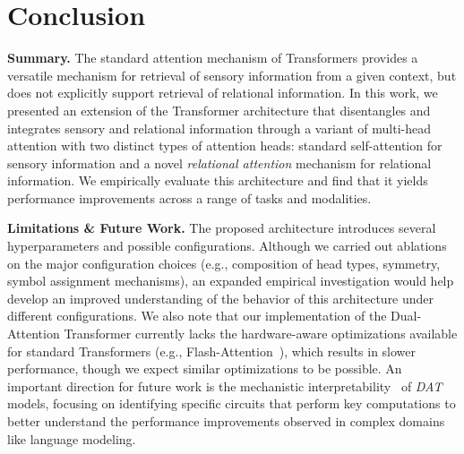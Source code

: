 \section{Conclusion}\label{sec:discussion}

\textbf{Summary.} The standard attention mechanism of Transformers provides a versatile mechanism for retrieval of sensory information from a given context, but does not explicitly support retrieval of relational information. In this work, we presented an extension of the Transformer architecture that disentangles and integrates sensory and relational information through a variant of multi-head attention with two distinct types of attention heads: standard self-attention for sensory information and a novel \textit{relational attention} mechanism for relational information. We empirically evaluate this architecture and find that it yields performance improvements across a range of tasks and modalities.

\textbf{Limitations \& Future Work.} The proposed architecture introduces several hyperparameters and possible configurations. Although we carried out ablations on the major configuration choices (e.g., composition of head types, symmetry, symbol assignment mechanisms), an expanded empirical investigation would help develop an improved understanding of the behavior of this architecture under different configurations. 
We also note that our implementation of the Dual-Attention Transformer currently lacks the hardware-aware optimizations available for standard Transformers (e.g., Flash-Attention~\citep{dao2022flashattention}), which results in slower performance, though we expect similar optimizations to be possible. An important direction for future work is the mechanistic interpretability~\citep{elhage2021mathematical,olsson2022context,wang2023interpretability} of \textit{DAT} models, focusing on identifying specific circuits that perform key computations to better understand the performance improvements observed in complex domains like language modeling.